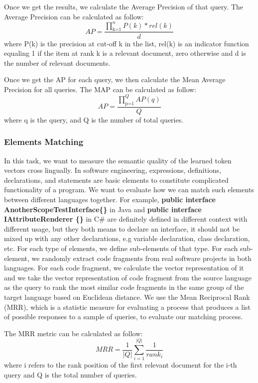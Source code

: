 Once we get the results, we calculate the Average Precision of that query. 
The Average Precision can be calculated as follow:
\begin{displaymath}
AP = \frac{\prod_\text{k=1}^n P(k)*rel(k)}{d}
\end{displaymath}
where P(k) is the precision at cut-off k in the list, rel(k) is an indicator function equaling 1 if the item at rank k is a relevant document, zero otherwise and d is the number of relevant documents.

Once we get the AP for each query, we then calculate the Mean Average Precision for all queries. The MAP can be calculated as follow:
\begin{displaymath}
AP = \frac{\prod_\text{p=1}^Q AP(q)}{Q}
\end{displaymath}
where q is the query, and Q is the number of total queries.

\subsubsection{Elements Matching}
In this task, we want to measure the semantic quality of the learned token vectors cross lingually. In software engineering, expressions, definitions, declarations, and statements are basic elements to constitute complicated functionality of a program. We want to evaluate how we can match such elements between different languages together. For example, \textbf{public interface AnotherScopeTestInterface\{\}} in Java and \textbf{public interface IAttributeRenderer \{\}} in C\# are definitely defined in different context with different usage, but they both means to declare an interface, it should not be mixed up with any other declarations, e.g variable declaration, class declaration, etc. For each type of elements, we define sub-elements of that type. For each sub-element, we randomly extract code fragments from real software projects in both languages. For each code fragment, we calculate the vector representation of it and we take the vector representation of code fragment from the source language as the query to rank the most similar code fragments in the same group of the target language based on Euclidean distance. We use the Mean Reciprocal Rank (MRR), which is a statistic measure for evaluating a process that produces a list of possible responses to a sample of queries, to evaluate our matching process.

The MRR metric can be calculated as follow:
\begin{displaymath}
MRR = \frac{1}{|Q|}\sum_{i=1}^{|Q|}\frac{1}{rank_{i}}
\end{displaymath}
where i refers to the rank position of the first relevant document for the i-th query and Q is the total number of queries.

